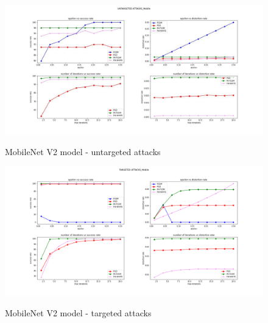 \documentclass[10pt,twocolumn,letterpaper, english]{article}
\theoremstyle{definition}
\theoremstyle{plain}
\theoremstyle{plain}
\theoremstyle{plain}
\theoremstyle{plain}
\theoremstyle{remark}
\theoremstyle{remark}
\theoremstyle{definition}
\theoremstyle{definition}
\theoremstyle{definition}
\theoremstyle{definition}
\begin{document}
\begin{figure}[ht]
  \centering
  \includegraphics[width=\textwidth]{./Images/MobileNet-Untargeted.jpeg}\\
  \caption{MobileNet V2 model - untargeted attacks } \label{mob-unt}
\end{figure}

\begin{figure}[ht]
  \centering
  \includegraphics[width=\textwidth]{./Images/Mobile_Grid_Targeted.png}\\
  \caption{MobileNet V2 model - targeted attacks } \label{mob-t}
\end{figure}




\end{document}
